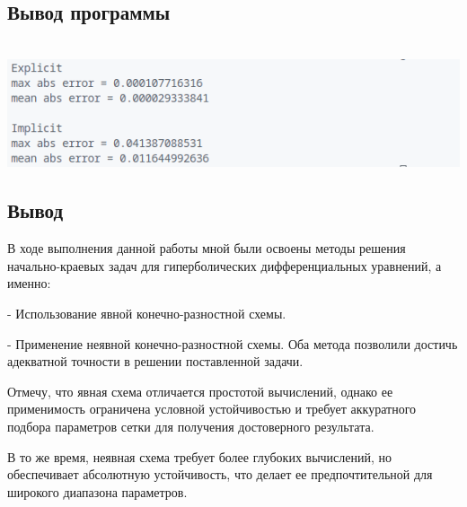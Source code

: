\documentclass{article}
\begin{document}
\subsection*{Вывод программы}
\\
\includegraphics[scale=0.7]{console.png}
\\

\subsection*{Вывод}

В ходе выполнения данной работы мной были освоены методы решения начально-краевых задач для гиперболических дифференциальных уравнений, а именно:

- Использование явной конечно-разностной схемы.

- Применение неявной конечно-разностной схемы.
Оба метода позволили достичь адекватной точности в решении поставленной задачи.

Отмечу, что явная схема отличается простотой вычислений, однако ее применимость ограничена условной устойчивостью и требует аккуратного подбора параметров сетки для получения достоверного результата.

В то же время, неявная схема требует более глубоких вычислений, но обеспечивает абсолютную устойчивость, что делает ее предпочтительной для широкого диапазона параметров.
\end{document}
